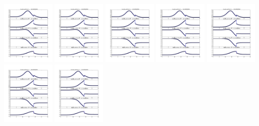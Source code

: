 \documentclass[11pt]{article}
\begin{document}
\vskip 10pt 
\includegraphics[width=0.19\textwidth]{frame0111fig1.png}
\vskip 10pt 
\includegraphics[width=0.19\textwidth]{frame0112fig1.png}
\vskip 10pt 
\includegraphics[width=0.19\textwidth]{frame0113fig1.png}
\vskip 10pt 
\includegraphics[width=0.19\textwidth]{frame0114fig1.png}
\vskip 10pt 
\includegraphics[width=0.19\textwidth]{frame0115fig1.png}
\vskip 10pt 
\includegraphics[width=0.19\textwidth]{frame0116fig1.png}
\vskip 10pt 
\includegraphics[width=0.19\textwidth]{frame0117fig1.png}
\end{document}
